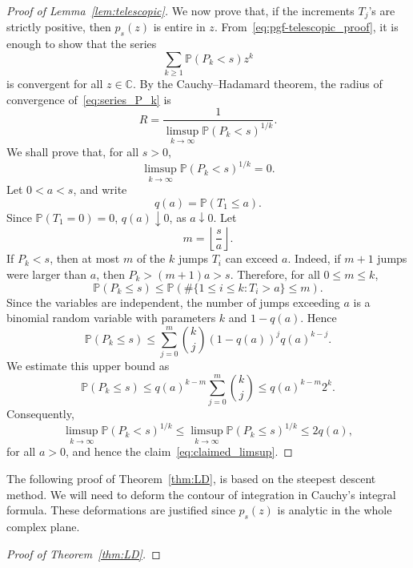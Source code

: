 \documentclass[a4paper,reqno,11pt]{amsart}
\numberwithin{equation}{section}
\def\C{{\mathbb C}}
\def\PR{\mathbb{P}}
\numberwithin{thm}{section}
\theoremstyle{plain}
\theoremstyle{definition}
\begin{document}
{\begin{proof}[Proof of Lemma~\ref{lem:telescopic}]
We now prove that, if the increments $T_j$'s are strictly positive, then $p_s(z)$ is entire in $z$. From~\eqref{eq:pgf-telescopic_proof}, it is enough to show that the series 
\begin{equation}
\label{eq:series_P_k}
   \sum_{k\geq1}\PR(P_{k}< s)z^{k} 
\end{equation}
is convergent for all $z\in\C$.
By the Cauchy--Hadamard theorem, the radius of convergence of~\eqref{eq:series_P_k} is
\begin{equation}
\label{eq:Cauchy-Hadamard}
  R=\frac{1}{\displaystyle
\limsup_{k\to\infty}\mathbb P(P_{k}< s)^{1/k}}.  
\end{equation}
We shall prove that, for all $s>0$,
\begin{equation}
\label{eq:claimed_limsup}
\limsup_{k\to\infty}\mathbb P(P_{k}< s)^{1/k}=0.
\end{equation}
Let $0<a<s$, and write
\begin{equation}
q(a)=\mathbb P(T_1\le a).
\end{equation}
Since $\mathbb P(T_1=0)=0$,  $q(a)\downarrow0$, as $a\downarrow0$.
Let 
$$ m=\left\lfloor \frac{s}{a}\right\rfloor.
$$
If $P_k< s$, then at most $m$ of the $k$ jumps $T_i$ can exceed $a$. Indeed, if
$m+1$ jumps were larger than $a$, then $
P_k> (m+1)a>s$.
 Therefore, for all $0\leq m\leq k$,
\[
\mathbb P(P_k\le s)
\le
\mathbb P\left(\#\{1\le i\le k:T_i> a\}\le m\right).
\]
Since the variables are independent, the number of jumps exceeding $a$ is a
binomial random variable with parameters $k$ and $1-q(a)$. Hence
\begin{equation}
\mathbb P(P_k\le s)
\le
\sum_{j=0}^{m}
\binom{k}{j}
(1-q(a))^j q(a)^{k-j}.
\end{equation}
We  estimate this upper bound as 
\[
\mathbb P(P_k\le s)
\le
q(a)^{k-m} 
\sum_{j=0}^{m}\binom{k}{j}\leq q(a)^{k-m} 2^k .
\]
Consequently,
\[
\limsup_{k\to\infty}\mathbb P(P_k < s)^{1/k}\leq \limsup_{k\to\infty}\mathbb P(P_k\le s)^{1/k}
\le 2 q(a),
\]
for all $a>0$, and hence the claim~\eqref{eq:claimed_limsup}.
\end{proof}
The following proof of Theorem~\ref{thm:LD}, is based on the steepest descent method. We will need to deform  the contour of integration in Cauchy's integral formula. These deformations are justified since $p_s(z)$ is analytic in the whole complex plane.

\begin{proof}[{Proof of Theorem~\ref{thm:LD}}] 



\end{proof}}
\end{document}
